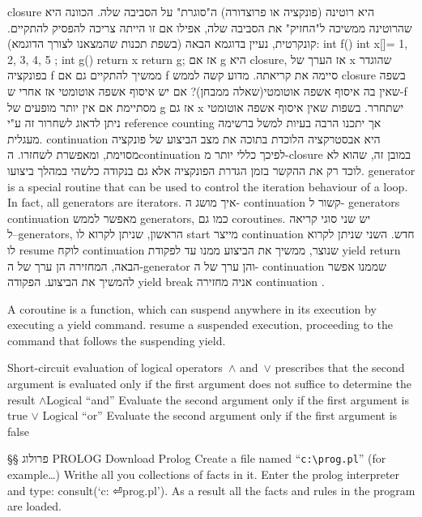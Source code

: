         closure היא רוטינה (פונקציה או פרוצדורה) ה"סוגרת" על הסביבה שלה. הכוונה היא שהרוטינה ממשיכה ל"החזיק" את הסביבה שלה, אפילו אם זו הייתה צריכה להפסיק להתקיים. קונקרטית, נעיין בדוגמא הבאה (בשפת תכנות שהמצאנו לצורך הדוגמא):
        int f(){
          int x[]={ 1, 2, 3, 4, 5 };
          int g(){ return x }
          return g;
        }
        אז אם g היא closure, אז הערך של x שהוגדר בפונקציה f ממשיך להתקיים גם אם f סיימה את קריאתה.
        מדוע קשה לממש closure בשפה שאין בה איסוף אשפה אוטומטי(שאלה ממבחן)?
        אם יש איסוף אשפה אוטומטי אז אחרי ש-f מסתיימת אם אין יותר מופעים של g אז גם x ישתחרר. בשפות שאין איסוף אשפה אוטומטי ניתן לדאוג לשחרור זה ע"י
        reference counting אך יתכנו הרבה בעיות למשל ברשימה מעגלית.
        continuation היא אבסטרקציה הלוכדת בתוכה את מצב הביצוע של פונקציה מסוימת,
        ומאפשרת לשחזרו. הcontinuation לפיכך כללי יותר מ-closure במובן זה, שהוא לא לוכד רק את ההקשר בזמן הגדרת הפונקציה אלא גם בנקודה כלשהי במהלך ביצועו.
        generator is a special routine that can be used to control the iteration behaviour of a loop. In fact, all generators are iterators.
        איך מושג ה- continuation קשור ל- generators
        continuation מאפשר לממש generators, כמו גם coroutines. יש שני סוגי קריאה ל--generators, הראשון, שניתן לקרוא לו start מייצר continuation חדש. השני שניתן לקרוא לו resume לוקח continuation שנוצר, ממשיך את הביצוע ממנו עד לפקודת yield return הבאה, המחזירה הן ערך של ה-generator והן ערך של ה- continuation שממנו אפשר להמשיך את הביצוע. הפקודה yield break אניה מחזירה continuation .

        A coroutine is a function, which can suspend anywhere in its execution by executing a yield command. resume a suspended execution, proceeding to the command that follows the suspending yield.

        Short-circuit evaluation of logical operators~$∧$ and~$∨$ prescribes that
        the second argument is evaluated only if the first argument does not
        suffice to determine the result
        $∧$Logical “and” Evaluate the second argument only if the first
        argument is true
        $∨$ Logical “or” Evaluate the second argument only if the first
        argument is false

        §§ פרולוג
        PROLOG
        Download Prolog
        Create a file named “\verb+c:\prog.pl+” (for example…)
        Writhe all you collections of facts in it.
        Enter the prolog interpreter and type: consult(‘c: ⏎prog.pl’).
        As a result all the facts and rules in the program are loaded.

